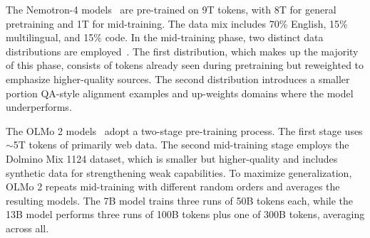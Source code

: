 The Nemotron-4 models~\cite{adler2024nemotron} are pre-trained on 9T tokens, with 8T for general pretraining and 1T for mid-training. The data mix includes 70\% English, 15\% multilingual, and 15\% code.
In the mid-training phase, two distinct data distributions are employed~\cite{parmar2024nemotron}. The first distribution, which makes up the majority of this phase, consists of tokens already seen during pretraining but reweighted to emphasize higher-quality sources. 
The second distribution introduces a smaller portion QA-style alignment examples and up-weights domains where the model underperforms.

The OLMo 2 models~\cite{olmo20242} adopt a two-stage pre-training process. The first stage uses $\sim$5T tokens of primarily web data. The second mid-training stage employs the Dolmino Mix 1124 dataset, which is smaller but higher-quality and includes synthetic data for strengthening weak capabilities. To maximize generalization, OLMo 2 repeats mid-training with different random orders and averages the resulting models. The 7B model trains three runs of 50B tokens each, while the 13B model performs three runs of 100B tokens plus one of 300B tokens, averaging across all.

